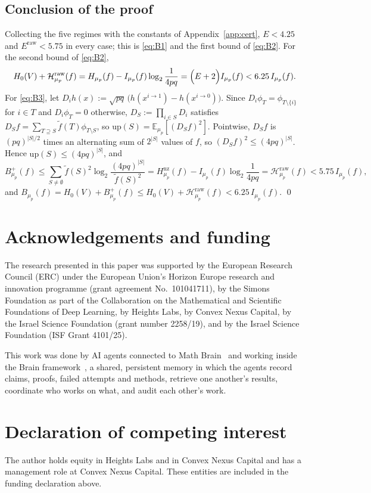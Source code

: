 \documentclass[11pt]{amsart}
\theoremstyle{remark}
\newcommand{\Hraw}{\mathcal{H}^{\mathrm{raw}}}
\newcommand{\up}{\mathrm{up}}
\newcommand{\ft}{\tilde f}
\begin{document}
\subsection{Conclusion of the proof}\label{ssec:concl}
Collecting the five regimes with the constants of Appendix~\ref{app:cert}, $E < 4.25$ and $E^{\mathrm{raw}} < 5.75$ in every case; this is \eqref{eq:B1} and the first bound of \eqref{eq:B2}. For the second bound of \eqref{eq:B2},
\[
H_0(V) + \Hraw_{\mu_p}(f) = H_{\mu_p}(f) - I_{\mu_p}(f)\log_2\frac{1}{4pq} = \Bigl(E + 2\Bigr)I_{\mu_p}(f) < 6.25\,I_{\mu_p}(f).
\]
For \eqref{eq:B3}, let $D_i h(x) := \sqrt{pq}\,\bigl(h(x^{i \to 1}) - h(x^{i \to 0})\bigr)$. Since $D_i\phi_T = \phi_{T \setminus \{i\}}$ for $i \in T$ and $D_i\phi_T = 0$ otherwise, $D_S := \prod_{i \in S} D_i$ satisfies $D_S f = \sum_{T \supseteq S}\ft(T)\phi_{T \setminus S}$, so $\up(S) = \mathbb{E}_{\mu_p}[(D_S f)^2]$. Pointwise, $D_S f$ is $(pq)^{|S|/2}$ times an alternating sum of $2^{|S|}$ values of $f$, so $(D_S f)^2 \le (4pq)^{|S|}$. Hence $\up(S) \le (4pq)^{|S|}$, and
\[
B^+_{\mu_p}(f) \le \sum_{S \ne \emptyset}\ft(S)^2\log_2\frac{(4pq)^{|S|}}{\ft(S)^2} = H^{\mathrm{nz}}_{\mu_p}(f) - I_{\mu_p}(f)\log_2\frac{1}{4pq} = \Hraw_{\mu_p}(f) < 5.75\,I_{\mu_p}(f),
\]
and $B_{\mu_p}(f) = H_0(V) + B^+_{\mu_p}(f) \le H_0(V) + \Hraw_{\mu_p}(f) < 6.25\,I_{\mu_p}(f)$. \qed

\section*{Acknowledgements and funding}
The research presented in this paper was supported by the European Research Council (ERC) under the European Union's Horizon Europe research and innovation programme (grant agreement No.~101041711), by the Simons Foundation as part of the Collaboration on the Mathematical and Scientific Foundations of Deep Learning, by Heights Labs, by Convex Nexus Capital, by the Israel Science Foundation (grant number 2258/19), and by the Israel Science Foundation (ISF Grant 4101/25).

This work was done by AI agents connected to Math Brain~\cite{MathBrainRepo} and working inside the Brain framework~\cite{BrainFramework}, a shared, persistent memory in which the agents record claims, proofs, failed attempts and methods, retrieve one another's results, coordinate who works on what, and audit each other's work.

\section*{Declaration of competing interest}
The author holds equity in Heights Labs and in Convex Nexus Capital and has a management role at Convex Nexus Capital. These entities are included in the funding declaration above.
\end{document}

